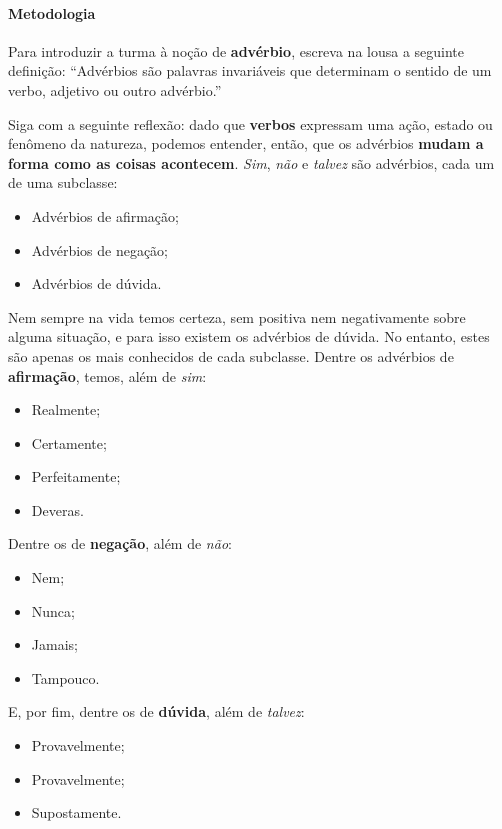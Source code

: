 \documentclass[11pt]{extarticle}
\begin{document}
\paragraph{Metodologia} Para introduzir a turma à noção de \textbf{advérbio}, escreva na lousa a
seguinte definição: ``Advérbios são palavras invariáveis que determinam o sentido de um verbo, adjetivo ou outro 
advérbio.''

Siga com a seguinte reflexão: dado que \textbf{verbos} expressam uma ação, estado ou fenômeno da natureza, 
podemos entender, então, que os advérbios \textbf{mudam a forma como as coisas acontecem}.
\textit{Sim}, \textit{não} e \textit{talvez} são advérbios, cada um de uma subclasse:

\begin{itemize}
	\item Advérbios de afirmação;
	\item Advérbios de negação;
	\item Advérbios de dúvida.
\end{itemize}

Nem sempre na vida temos certeza, sem positiva nem negativamente sobre alguma situação,
e para isso existem os advérbios de dúvida. No entanto, estes são apenas os mais conhecidos
de cada subclasse. Dentre os advérbios de \textbf{afirmação}, temos, além de \textit{sim}:

\begin{itemize}
	\item Realmente;
	\item Certamente;
	\item Perfeitamente;
	\item Deveras.
\end{itemize}

Dentre os de \textbf{negação}, além de \textit{não}:

\begin{itemize}
	\item Nem;
	\item Nunca;
	\item Jamais;
	\item Tampouco.
\end{itemize}

E, por fim, dentre os de \textbf{dúvida}, além de \textit{talvez}:

\begin{itemize}
	\item Provavelmente;
	\item Provavelmente;
	\item Supostamente.
\end{itemize}
\end{document}

